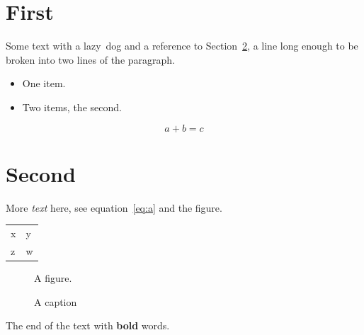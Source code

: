 \documentclass{article}
\newcommand{\word}{lazy}
\begin{document}
\section{First}\label{sec:a}
Some text with a \word\ dog and a reference to Section~\ref{sec:b}, a
line long enough to be broken into two lines of the paragraph.

\begin{itemize}
\item One item.
\item Two items, the second.
\end{itemize}

\begin{equation}
a+b=c \label{eq:a}
\end{equation}

\section{Second}\label{sec:b}
More \emph{text} here, see equation~\ref{eq:a} and the figure.

\begin{tabular}{ll}
x & y \\
z & w \\
\end{tabular}

\begin{figure}[h]
\centering A figure. \caption{A caption}\label{fig:a}
\end{figure}

The end of the text with \textbf{bold} words.
\end{document}
